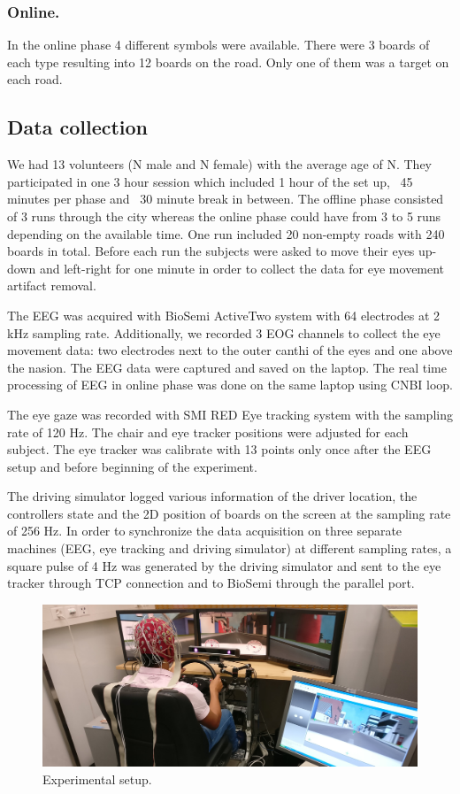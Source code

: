 \documentclass[12pt]{iopart}
\begin{document}
\subsubsection*{Online.}
In the online phase 4 different symbols were available. There were
3 boards of each type resulting into 12 boards on the road.
Only one of them was a target on each road.


\subsection{Data collection}
We had 13 volunteers (N male and N female) with the average age of N.
They participated in one 3 hour session which included
1 hour of the set up, ~45 minutes per phase and ~30 minute break in between.
The offline phase consisted of 3 runs through the city  whereas the online
phase could have from 3 to 5 runs depending on the available time.
One run included 20 non-empty roads with 240 boards in total.
Before each run the subjects were asked to move their eyes up-down and left-right
for one minute in order to collect the data for eye movement artifact removal.

The EEG was acquired with BioSemi ActiveTwo system with 64 electrodes at 2 kHz sampling rate.
Additionally, we recorded 3 EOG channels to collect the eye movement data:
two electrodes next to the outer canthi of the eyes and one above the nasion.
The EEG data were captured and saved on the laptop. The real time processing
of EEG in online phase was done on the same laptop using CNBI loop.

The eye gaze was recorded with SMI RED Eye tracking system with the sampling rate of 120 Hz.
The chair and eye tracker positions were adjusted for each subject. The eye tracker
was calibrate with 13 points only once after the EEG setup and before beginning of 
the experiment.

The driving simulator logged various information of the driver location,
the controllers state and the 2D position of boards on the screen at the sampling rate
of 256 Hz. In order to synchronize the data acquisition on three separate machines
(EEG, eye tracking and driving simulator) at different sampling rates,
a square pulse of 4 Hz was generated by the driving simulator and sent 
to the eye tracker through TCP connection and to BioSemi through the parallel port.



\begin{figure}[!t]
    \includegraphics[trim={0cm 0cm 0cm 0cm},clip,width=0.6\columnwidth]{../images/Driving-photo.jpg}
    \caption{Experimental setup.}
\label{fig:setup}
\end{figure}
\end{document}
